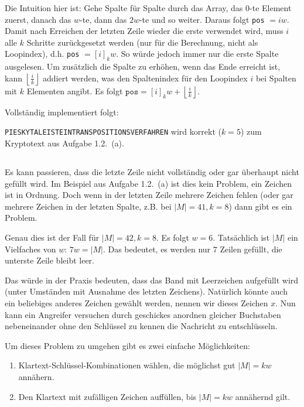 \documentclass{../crypto}
\begin{document}
Die Intuition hier ist: Gehe Spalte für Spalte durch das Array, das $0$-te
Element zuerst, danach das $w$-te, dann das $2w$-te und so weiter. Daraus folgt
\texttt{pos} $= iw$. Damit nach Erreichen der letzten Zeile wieder die erste
verwendet wird, muss $i$ alle $k$ Schritte zurückgesetzt werden (nur für die
Berechnung, nicht als Loopindex), d.h. \texttt{pos} $= \left[i\right]_kw$. So
würde jedoch immer nur die erste Spalte ausgelesen. Um zusätzlich die Spalte zu
erhöhen, wenn das Ende erreicht ist, kann $\left\lfloor\frac{i}{k}\right\rfloor$
addiert werden, was den Spaltenindex für den Loopindex $i$ bei Spalten mit $k$
Elementen angibt. Es folgt $\texttt{pos} = \left[i\right]_kw +
\left\lfloor\frac{i}{k}\right\rfloor$.

Vollständig implementiert folgt:

\texttt{PIESKYTALEISTEINTRANSPOSITIONSVERFAHREN} wird korrekt ($k=5$) zum Kryptotext aus Aufgabe 1.2.~(a).

\subsection{}
Es kann passieren, dass die letzte Zeile nicht vollständig oder gar überhaupt
nicht gefüllt wird. Im Beispiel aus Aufgabe 1.2.~(a) ist dies kein Problem, ein
Zeichen ist in Ordnung.  Doch wenn in der letzten Zeile mehrere Zeichen fehlen
(oder gar mehrere Zeichen in der letzten Spalte, z.B. bei $|M|=41, k=8$) dann
gibt es ein Problem.

Genau dies ist der Fall für $|M|=42, k=8$. Es folgt $w=6$. Tatsächlich ist $|M|$
ein Vielfaches von $w$: $7w=|M|$. Das bedeutet, es werden nur 7 Zeilen gefüllt,
die unterste Zeile bleibt leer.

Das würde in der Praxis bedeuten, dass das Band mit Leerzeichen aufgefüllt wird
(unter Umständen mit Ausnahme des letzten Zeichens). Natürlich könnte auch ein
beliebiges anderes Zeichen gewählt werden, nennen wir dieses Zeichen $x$. Nun
kann ein Angreifer versuchen durch geschickes anordnen gleicher Buchstaben
nebeneinander ohne den Schlüssel zu kennen die Nachricht zu entschlüsseln.

Um dieses Problem zu umgehen gibt es zwei einfache Möglichkeiten:

\begin{enumerate}
	\item Klartext-Schlüssel-Kombinationen wählen, die möglichst gut $|M|=kw$ annähern.
  \item Den Klartext mit zufälligen Zeichen auffüllen, bis $|M|=kw$ annähernd gilt.
\end{enumerate}
\end{document}
